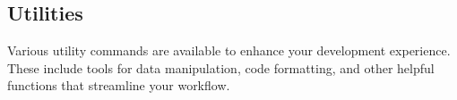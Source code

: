 \subsection*{Utilities}

Various utility commands are available to enhance your development experience. These include tools for data manipulation, code formatting, and other helpful functions that streamline your workflow.
